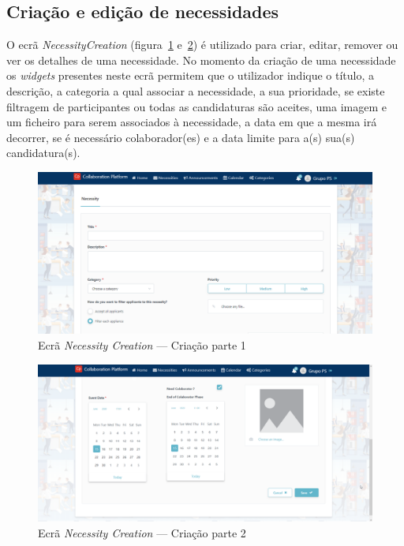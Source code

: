 \subsection{Criação e edição de necessidades}\label{subsec:implementacao:necessityCreation}

O ecrã \textit{NecessityCreation} (figura~\ref{fig:necessityCreation1} e~\ref{fig:necessityCreation2}) é utilizado para criar, editar, remover ou ver os detalhes de uma necessidade.
No momento da criação de uma necessidade os \textit{widgets} presentes neste ecrã permitem que o utilizador indique o título, a descrição, a categoria a qual associar a necessidade, a sua prioridade, 
se existe filtragem de participantes ou todas as candidaturas são aceites, uma imagem e um ficheiro para serem associados à necessidade, a data em que a mesma irá decorrer, se é necessário colaborador(es) e a data limite para a(s) sua(s) candidatura(s).

\begin{figure}[H]
  \centering 
  \includegraphics[scale=0.4]{figures/NecessityCreation1.png}
  \caption{Ecrã \textit{Necessity Creation} --- Criação parte 1}\label{fig:necessityCreation1}
\end{figure}



\begin{figure}[H]
  \centering 
  \includegraphics[scale=0.3]{figures/NecessityCreation2.png}
  \caption{Ecrã \textit{Necessity Creation} --- Criação parte 2}\label{fig:necessityCreation2}
\end{figure}



